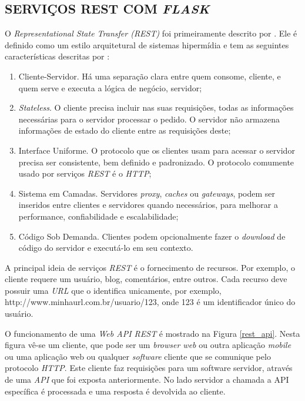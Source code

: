 \subsection{SERVIÇOS REST COM \emph{FLASK}}
\label{servicos_rest}

O \emph{Representational State Transfer (REST)} foi primeiramente descrito por . 
Ele é definido como um estilo arquitetural de sistemas hipermídia e tem as seguintes características descritas por :

\begin{enumerate}
	\item Cliente-Servidor. Há uma separação clara entre quem consome, cliente, e quem serve e executa a lógica de negócio, servidor;
	\item \emph{Stateless}. O cliente precisa incluir nas suas requisições, todas as informações necessárias para o servidor processar o pedido. O servidor não armazena informações de estado do cliente entre as requisições deste;
	\item Interface Uniforme. O protocolo que os clientes usam para acessar o servidor precisa ser consistente, bem definido e padronizado. O protocolo comumente usado por serviços \emph{REST} é o \emph{HTTP};
	\item Sistema em Camadas. Servidores \emph{proxy}, \emph{caches} ou \emph{gateways}, podem ser inseridos entre clientes e servidores quando necessários, para melhorar a performance, confiabilidade e escalabilidade;
	\item Código Sob Demanda. Clientes podem opcionalmente fazer o \emph{download} de código do servidor e executá-lo em seu contexto.
\end{enumerate}

A principal ideia de serviços \emph{REST} é o fornecimento de recursos. 
Por exemplo, o cliente requere um usuário, blog, comentários, entre outros. 
Cada recurso deve possuir uma \emph{URL} que o identifica unicamente, por exemplo, http://www.minhaurl.com.br/usuario/123, onde 123 é um identificador único do usuário.

O funcionamento de uma \emph{Web API REST} é mostrado na Figura \ref{rest_api}. Nesta figura vê-se um cliente, que pode ser um \emph{browser web} ou outra aplicação \emph{mobile} ou uma aplicação web ou qualquer \emph{software} cliente que se comunique pelo protocolo \emph{HTTP}. Este cliente faz requisições para um software servidor, através de uma \emph{API} que foi exposta anteriormente. No lado servidor a chamada a API específica é processada e uma resposta é devolvida ao cliente.

